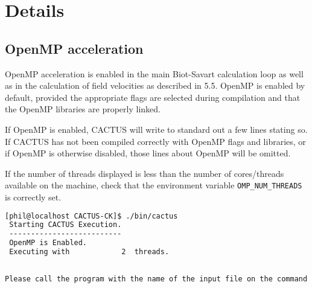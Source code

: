\chapter{Details}
\section{OpenMP acceleration}
OpenMP acceleration is enabled in the main Biot-Savart calculation loop as well as in the calculation of field velocities as described in 5.5. OpenMP is enabled by default, provided the appropriate flags are selected during compilation and that the OpenMP libraries are properly linked.

If OpenMP is enabled, CACTUS will write to standard out a few lines stating so. If CACTUS has not been compiled correctly with OpenMP flags and libraries, or if OpenMP is otherwise disabled, those lines about OpenMP will be omitted.

If the number of threads displayed is less than the number of cores/threads available on the machine, check that the environment variable \texttt{OMP\_NUM\_THREADS} is correctly set.

\begin{lstlisting}[language=bash]
[phil@localhost CACTUS-CK]$ ./bin/cactus 
 Starting CACTUS Execution.
 --------------------------
 OpenMP is Enabled.
 Executing with            2  threads.
 
 
Please call the program with the name of the input file on the command line. Ex. CACTUS INPUTFILE.in
\end{lstlisting}